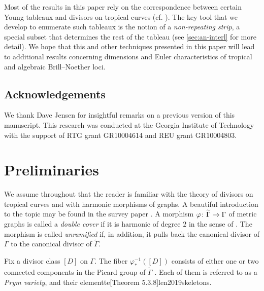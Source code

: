 \documentclass[11pt,reqno]{amsart}
\newcommand*{\maps}{\nobreak\mskip2mu\mathpunct{}\nonscript
  \mkern-\thinmuskip{:}\mskip6muplus1mu\relax}
\newcommand*{\wti}[1]{\widetilde{#1}}
\DeclareMathOperator{\Jac}{Jac}
\theoremstyle{definition}
\theoremstyle{problem}
\theoremstyle{plain}
\theoremstyle{remark}
\theoremstyle{theorem}
\numberwithin{equation}{section}
\numberwithin{figure}{section}
\begin{document}
Most of the results in this paper rely on the correspondence between certain Young tableaux and divisors on tropical curves (cf. \cite{CDPR, pflueger2017special}). The key tool that we develop to enumerate such tableaux is the notion of a \emph{non-repeating strip}, a special subset that determines the rest of the tableau (see \cref{sec:an-interl} for more detail).
We hope that this and  other techniques presented in this paper will lead to additional results concerning dimensions and Euler characteristics of tropical and algebraic Brill--Noether loci. 



       \subsection*{Acknowledgements} 
       We thank Dave Jensen for insightful remarks on a previous version of this manuscript. 
    This   research was conducted at the Georgia Institute of Technology
    with the support of RTG grant GR10004614 and REU grant
    GR10004803. 
    
\section{Preliminaries}\label{sec:preliminaries}
We assume throughout that the reader is familiar with the theory of
divisors on tropical curves and with harmonic morphisms of graphs. A
beautiful introduction to the topic may be found in the survey paper
\cite{BJ}.  A morphism $\varphi\maps\wti\Gamma\to\Gamma$ of metric
graphs is called a \emph{double cover} if it is harmonic of degree $2$
in the sense of \cite{ABBR15}. The morphism is called
\emph{unramified} if, in addition, it pulls back the canonical divisor
of $\Gamma$ to the canonical divisor of $\widetilde\Gamma$.



Fix a divisor class $[D]$ on $\Gamma$. The fiber
$\varphi^{-1}_{*}([D])$ consists of either one or two connected
components in the Picard group of $\widetilde\Gamma$ \cite[Proposition
6.1]{JL}. Each of them is referred to as a \emph{Prym variety}, and
their elementte[Theorem 5.3.8]{len2019skeletons}.
\end{document}
